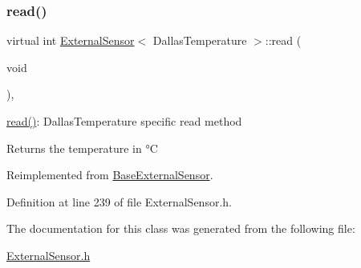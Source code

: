 \subsubsection{\texorpdfstring{read()}{read()}}
{\footnotesize\ttfamily virtual int \hyperlink{class_external_sensor}{External\+Sensor}$<$ Dallas\+Temperature $>$\+::read (\begin{DoxyParamCaption}\item[{void}]{ }\end{DoxyParamCaption})\hspace{0.3cm}{\ttfamily [inline]}, {\ttfamily [virtual]}}

\hyperlink{class_external_sensor_3_01_dallas_temperature_01_4_a127ead06440ec972c22db2abeb8e2b51}{read()}\+: Dallas\+Temperature specific read method

\begin{DoxyReturn}{Returns}
the temperature in °C 
\end{DoxyReturn}


Reimplemented from \hyperlink{class_base_external_sensor_a7e0a98f350148d7645031315657aa5ec}{Base\+External\+Sensor}.



Definition at line 239 of file External\+Sensor.\+h.



The documentation for this class was generated from the following file\+:\begin{DoxyCompactItemize}
\item 
\hyperlink{_external_sensor_8h}{External\+Sensor.\+h}\end{DoxyCompactItemize}
